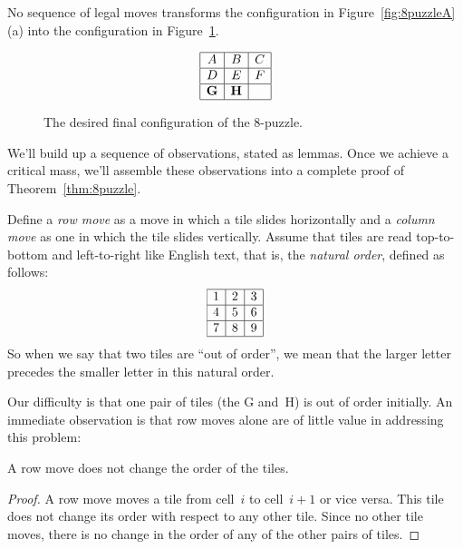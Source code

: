 \begin{theorem}\label{thm:8puzzle}
No sequence of legal moves transforms the configuration in
Figure~\ref{fig:8puzzleA}(a) into the configuration in
Figure~\ref{fig:8puzzlesolved}.
\end{theorem}

\begin{figure}[h]
\begin{equation*}
\begin{array}{|c|c|c|}
\hline
A & B & C \\ \hline
D & E & F \\ \hline
\mathbf{G} & \mathbf{H} &   \\ \hline
\end{array}
\end{equation*}

\caption{The desired final configuration of the 8-puzzle.}
\label{fig:8puzzlesolved}
\end{figure}

We'll build up a sequence of observations, stated as lemmas.  Once we
achieve a critical mass, we'll assemble these observations into a
complete proof of Theorem~\ref{thm:8puzzle}.

Define a \emph{row move} as a move in which a tile slides horizontally
and a \emph{column move} as one in which the tile slides vertically.
Assume that tiles are read top-to-bottom and left-to-right like
English text, that is, the \emph{natural order}, defined as follows:
\begin{equation*}
\begin{array}{|c|c|c|}
\hline
1 & 2 & 3 \\ \hline
4 & 5 & 6 \\ \hline
7 & 8 & 9 \\ \hline
\end{array}
\end{equation*}
So when we say that two tiles are ``out of order'', we mean that the
larger letter precedes the smaller letter in this natural order.

Our difficulty is that one pair of tiles (the G and~H) is out of order
initially.  An immediate observation is that row moves alone are of
little value in addressing this problem:
\begin{lemma}\label{lem:8puzzleA}
A row move does not change the order of the tiles.
\end{lemma}

\begin{proof}
A row move moves a tile from cell~$i$ to cell~$i + 1$ or vice versa.
This tile does not change its order with respect to any other tile.
Since no other tile moves, there is no change in the order of any of
the other pairs of tiles.
\end{proof}

